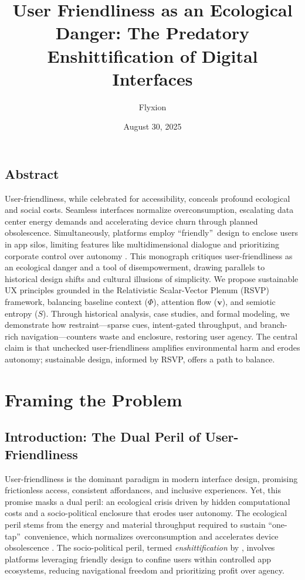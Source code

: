 \documentclass[openany]{book}
\title{User Friendliness as an Ecological Danger: The Predatory Enshittification of Digital Interfaces}
\author{Flyxion}
\date{August 30, 2025}
\newcommand{\PhiS}{\Phi} %
\newcommand{\vvec}{\mathbf{v}} %
\newcommand{\Sent}{S} %
\begin{document}
\maketitle
{}

\chapter*{Abstract}
User-friendliness, while celebrated for accessibility, conceals profound ecological and social costs. Seamless interfaces normalize overconsumption, escalating data center energy demands and accelerating device churn through planned obsolescence. Simultaneously, platforms employ \textquotedblleft friendly\textquotedblright\ design to enclose users in app silos, limiting features like multidimensional dialogue and prioritizing corporate control over autonomy \citep{doctorow2022}. This monograph critiques user-friendliness as an ecological danger and a tool of disempowerment, drawing parallels to historical design shifts and cultural illusions of simplicity. We propose sustainable UX principles grounded in the Relativistic Scalar-Vector Plenum (RSVP) framework, balancing baseline context (\(\PhiS\)), attention flow (\(\vvec\)), and semiotic entropy (\(\Sent\)). Through historical analysis, case studies, and formal modeling, we demonstrate how restraint---sparse cues, intent-gated throughput, and branch-rich navigation---counters waste and enclosure, restoring user agency. The central claim is that unchecked user-friendliness amplifies environmental harm and erodes autonomy; sustainable design, informed by RSVP, offers a path to balance.

\clearpage
{}
\tableofcontents
\clearpage
{}

\part{Framing the Problem}

\chapter{Introduction: The Dual Peril of User-Friendliness}
\label{ch:intro}

User-friendliness is the dominant paradigm in modern interface design, promising frictionless access, consistent affordances, and inclusive experiences. Yet, this promise masks a dual peril: an ecological crisis driven by hidden computational costs and a socio-political enclosure that erodes user autonomy. The ecological peril stems from the energy and material throughput required to sustain \textquotedblleft one-tap\textquotedblright\ convenience, which normalizes overconsumption and accelerates device obsolescence \citep{extentia2024}. The socio-political peril, termed \emph{enshittification} by \citet{doctorow2022}, involves platforms leveraging friendly design to confine users within controlled app ecosystems, reducing navigational freedom and prioritizing profit over agency.
\end{document}
